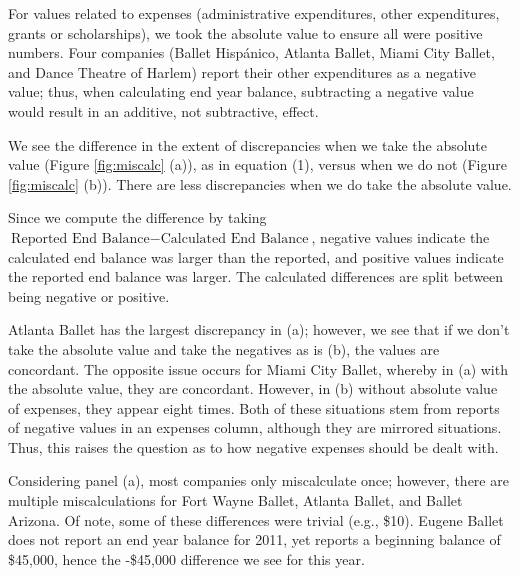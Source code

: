 \documentclass[Dance Data
Project,article,submit,moreauthors,pdftex]{mdpi}
\begin{document}
For values related to expenses (administrative expenditures, other
expenditures, grants or scholarships), we took the absolute value to
ensure all were positive numbers. Four companies (Ballet Hispánico,
Atlanta Ballet, Miami City Ballet, and Dance Theatre of Harlem) report
their other expenditures as a negative value; thus, when calculating end
year balance, subtracting a negative value would result in an additive,
not subtractive, effect.

We see the difference in the extent of discrepancies when we take the
absolute value (Figure \ref{fig:miscalc} (a)), as in equation (1),
versus when we do not (Figure \ref{fig:miscalc} (b)). There are less
discrepancies when we do take the absolute value.

Since we compute the difference by taking
\(\text{Reported End Balance} - \text{Calculated End Balance}\),
negative values indicate the calculated end balance was larger than the
reported, and positive values indicate the reported end balance was
larger. The calculated differences are split between being negative or
positive.

Atlanta Ballet has the largest discrepancy in (a); however, we see that
if we don't take the absolute value and take the negatives as is (b),
the values are concordant. The opposite issue occurs for Miami City
Ballet, whereby in (a) with the absolute value, they are concordant.
However, in (b) without absolute value of expenses, they appear eight
times. Both of these situations stem from reports of negative values in
an expenses column, although they are mirrored situations. Thus, this
raises the question as to how negative expenses should be dealt with.

Considering panel (a), most companies only miscalculate once; however,
there are multiple miscalculations for Fort Wayne Ballet, Atlanta
Ballet, and Ballet Arizona. Of note, some of these differences were
trivial (e.g., \$10). Eugene Ballet does not report an end year balance
for 2011, yet reports a beginning balance of \$45,000, hence the
-\$45,000 difference we see for this year.
\end{document}
